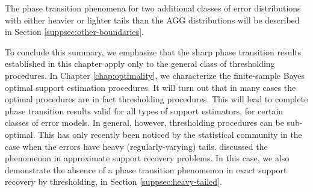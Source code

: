 \medskip
The phase transition phenomena for two additional classes of error distributions with either heavier or lighter tails than the AGG distributions will be described in Section \ref{suppsec:other-boundaries}.

\medskip
To conclude this summary, we emphasize that the sharp phase transition results established in this chapter apply only to
the general class of thresholding procedures.  In Chapter \ref{chap:optimality}, we characterize the finite-sample Bayes optimal support estimation procedures.
It will turn out that in many cases the optimal procedures are in fact thresholding procedures.  This will lead to complete phase transition
results valid for all types of support estimators, for certain classes of error models. In general, however, thresholding procedures
can be sub-optimal.  This has only recently been noticed by the statistical community in the case when the errors have heavy (regularly-varying) tails. 
\citet{arias2019detection} discussed the phenomenon in approximate support recovery problems.  In this case, we also demonstrate the absence 
of a phase transition phenomenon in exact support recovery by thresholding, in Section \ref{suppsec:heavy-tailed}. 










